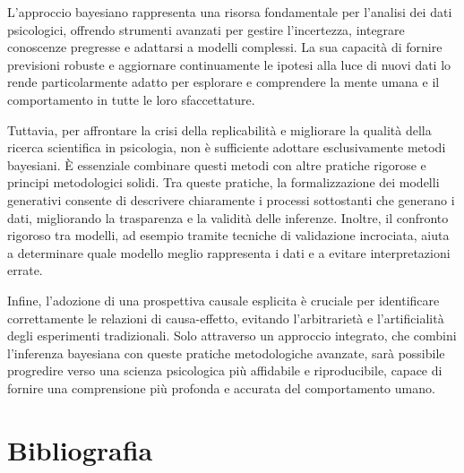 \documentclass[
  letterpaper,
  krantz2]{{[}./krantz{]}}
\begin{document}

L'approccio bayesiano rappresenta una risorsa fondamentale per l'analisi
dei dati psicologici, offrendo strumenti avanzati per gestire
l'incertezza, integrare conoscenze pregresse e adattarsi a modelli
complessi. La sua capacità di fornire previsioni robuste e aggiornare
continuamente le ipotesi alla luce di nuovi dati lo rende
particolarmente adatto per esplorare e comprendere la mente umana e il
comportamento in tutte le loro sfaccettature.

Tuttavia, per affrontare la crisi della replicabilità e migliorare la
qualità della ricerca scientifica in psicologia, non è sufficiente
adottare esclusivamente metodi bayesiani. È essenziale combinare questi
metodi con altre pratiche rigorose e principi metodologici solidi. Tra
queste pratiche, la formalizzazione dei modelli generativi consente di
descrivere chiaramente i processi sottostanti che generano i dati,
migliorando la trasparenza e la validità delle inferenze. Inoltre, il
confronto rigoroso tra modelli, ad esempio tramite tecniche di
validazione incrociata, aiuta a determinare quale modello meglio
rappresenta i dati e a evitare interpretazioni errate.

Infine, l'adozione di una prospettiva causale esplicita è cruciale per
identificare correttamente le relazioni di causa-effetto, evitando
l'arbitrarietà e l'artificialità degli esperimenti tradizionali. Solo
attraverso un approccio integrato, che combini l'inferenza bayesiana con
queste pratiche metodologiche avanzate, sarà possibile progredire verso
una scienza psicologica più affidabile e riproducibile, capace di
fornire una comprensione più profonda e accurata del comportamento
umano.


\chapter*{Bibliografia}\label{bibliografia}

\end{document}
